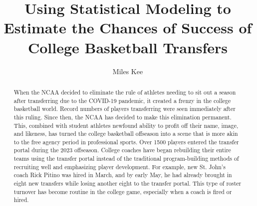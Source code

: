 \documentclass[12pt]{article}
\title{Using Statistical Modeling to Estimate the Chances of Success of College Basketball Transfers}
\author{Miles Kee}
\begin{document}
\maketitle

\begin{abstract}
When the NCAA decided to eliminate the rule of athletes needing to sit out a season after transferring due to the COVID-19 pandemic, it created a frenzy in the college basketball world. Record numbers of players transferring were seen immediately after this ruling. Since then, the NCAA has decided to make this elimination permanent. This, combined with student athletes newfound ability to profit off their name, image, and likeness, has turned the college basketball offseason into a scene that is more akin to the free agency period in professional sports. Over 1500 players entered the transfer portal during the 2023 offseason. College coaches have began rebuilding their entire teams using the transfer portal instead of the traditional program-building methods of recruiting well and emphasizing player development. For example, new St. John's coach Rick Pitino was hired in March, and by early May, he had already brought in eight new transfers while losing another eight to the transfer portal. This type of roster turnover has become routine in the college game, especially when a coach is fired or hired. 
\end{abstract}
\end{document}
